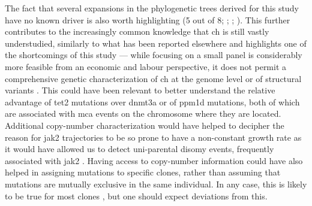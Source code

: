 The fact that several expansions in the phylogenetic trees derived for this study have no known driver is also worth highlighting (5 out of 8; ; ; ). This further contributes to the increasingly common knowledge that \ac{ch} is still vastly understudied, similarly to what has been reported elsewhere \cite{Poon2020-ek,Zink2017-zi} and highlights one of the shortcomings of this study --- while focusing on a small panel is considerably more feasible from an economic and labour perspective, it does not permit a comprehensive genetic characterization of \ac{ch} at the genome level or of structural variants \cite{Gao2021-ph,Terao2020-dd,Loh2020-vz,Loh2018-xp}. This could have been relevant to better understand the relative advantage of \ac{tet2} mutations over \ac{dnmt3a} or of \ac{ppm1d} mutations, both of which are associated with \ac{mca} events on the chromosome where they are located. Additional copy-number characterization would have helped to decipher the reason for \ac{jak2} trajectories to be so prone to have a non-constant growth rate as it would have allowed us to detect uni-parental disomy events, frequently associated with \ac{jak2} \cite{Wang2014-qz}. Having access to copy-number information could have also helped in assigning mutations to specific clones, rather than assuming that mutations are mutually exclusive in the same individual. In any case, this is likely to be true for most clones \cite{Miles2020-fz}, but one should expect deviations from this. 

